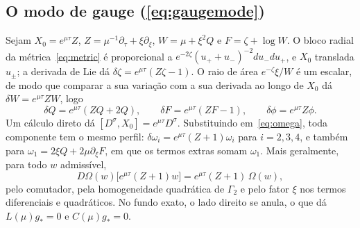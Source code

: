 \subsection{O modo de gauge (\cref{eq:gaugemode})}\label{app:gauge}

Sejam $X_0=e^{\mu\tau}Z$, $Z=\mu^{-1}\partial_\tau+\xi\partial_\xi$, $W=\mu+\xi^2Q$ e $F=\zeta+\log W$. O bloco
radial da métrica~\eqref{eq:metric} é proporcional a $e^{-2\zeta}(u_++u_-)^{-2}du_-du_+$, e $X_0$ translada
$u_\pm$; a derivada de Lie dá $\delta\zeta=e^{\mu\tau}(Z\zeta-1)$. O raio de área $e^{-\zeta}\xi/W$ é um escalar,
de modo que comparar a sua variação com a sua derivada ao longo de $X_0$ dá $\delta W=e^{\mu\tau}ZW$, logo
\[
  \delta Q=e^{\mu\tau}(ZQ+2Q),\qquad \delta F=e^{\mu\tau}(ZF-1),\qquad \delta\phi=e^{\mu\tau}Z\phi .
\]
Um cálculo direto dá $[D^\sigma,X_0]=e^{\mu\tau}D^\sigma$. Substituindo em~\eqref{eq:omega}, toda componente
tem o mesmo perfil: $\delta\omega_i=e^{\mu\tau}(Z+1)\omega_i$ para $i=2,3,4$, e também para $\omega_1=2\xi Q+2\mu\partial_\xi F$,
em que os termos extras somam $\omega_1$. Mais geralmente, para todo $w$ admissível,
\[
  D\Omega(w)\big[e^{\mu\tau}(Z+1)w\big]=e^{\mu\tau}(Z+1)\,\Omega(w),
\]
pelo comutador, pela homogeneidade quadrática de $\Gamma_2$ e pelo fator $\xi$ nos termos diferenciais e
quadráticos. No fundo exato, o lado direito se anula, o que dá $L(\mu)g_*=0$ e $C(\mu)g_*=0$.
